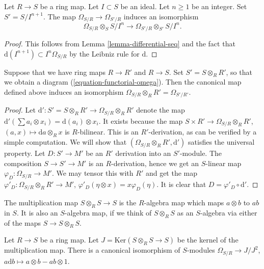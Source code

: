 \begin{lemma}
\label{lemma-differential-mod-power-ideal}
Let $R \to S$ be a ring map. Let $I \subset S$ be an ideal.
Let $n \geq 1$ be an integer. Set $S' = S/I^{n + 1}$.
The map $\Omega_{S/R} \to \Omega_{S'/R}$ induces an
isomorphism
$$
\Omega_{S/R} \otimes_S S/I^n
\longrightarrow
\Omega_{S'/R} \otimes_{S'} S/I^n.
$$
\end{lemma}

\begin{proof}
This follows from Lemma \ref{lemma-differential-seq} and the fact that
$\text{d}(I^{n + 1}) \subset I^n\Omega_{S/R}$ by the
Leibniz rule for $\text{d}$.
\end{proof}

\begin{lemma}
\label{lemma-differentials-base-change}
Suppose that we have ring maps $R \to R'$ and $R \to S$.
Set $S' = S\otimes_R R'$, so that we obtain a diagram
(\ref{equation-functorial-omega}). Then the canonical map defined above
induces an isomorphism $\Omega_{S/R} \otimes_R R' = \Omega_{S'/R'}$.
\end{lemma}

\begin{proof}
Let $\text{d}' : S' = S\otimes_R R' \to \Omega_{S/R} \otimes_R R'$ denote the
map $\text{d}'( \sum a_i \otimes x_i ) = \text{d}(a_i) \otimes x_i$.
It exists because the map $S \times R' \to \Omega_{S/R} \otimes_R R'$,
$(a, x)\mapsto \text{d}a\otimes_R x$ is $R$-bilinear.
This is an $R'$-derivation, as can be verified by a simple computation.
We will show that $(\Omega_{S/R} \otimes_R R', \text{d}')$ satisfies
the universal property. Let $D : S' \to M'$ be an $R'$ derivation
into an $S'$-module. The composition $S \to S' \to M'$ is an $R$-derivation,
hence we get an $S$-linear map $\varphi_D : \Omega_{S/R} \to M'$. We may
tensor this with $R'$ and get the map $\varphi'_D :
\Omega_{S/R} \otimes_R R' \to M'$, $\varphi'_D(\eta \otimes x) =
x\varphi_D(\eta)$. It is clear that $D = \varphi'_D \circ \text{d}'$.
\end{proof}

\noindent
The multiplication map $S\otimes_R S \to S$ is the $R$-algebra
map which maps $a \otimes b$ to $ab$ in $S$. It is also an
$S$-algebra map, if we think of $S\otimes_R S$ as an $S$-algebra
via either of the maps $S \to S\otimes_R S$.

\begin{lemma}
\label{lemma-differentials-diagonal}
Let $R \to S$ be a ring map. Let $J = \text{Ker}(S\otimes_R S \to S)$
be the kernel of the multiplication map. There is a canonical
isomorphism of $S$-modules $\Omega_{S/R} \to J/J^2$,
$a \text{d} b \mapsto a\otimes b - ab\otimes 1$.
\end{lemma}

